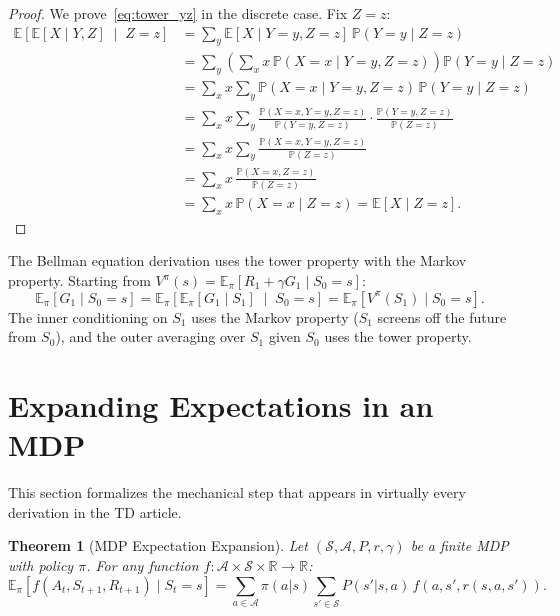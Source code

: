 \documentclass[11pt,a4paper]{article}
\theoremstyle{definition}
\theoremstyle{plain}
\newtheorem{theorem}{Theorem}[section]
\theoremstyle{remark}
\newcommand{\E}{\mathbb{E}}
\newcommand{\R}{\mathbb{R}}
\newcommand{\Prob}{\mathbb{P}}
\begin{document}
\begin{proof}
We prove~\eqref{eq:tower_yz} in the discrete case. Fix $Z = z$:
\begin{align}
    \E\!\left[\E[X \mid Y, Z] \;\middle|\; Z = z\right]
    &= \sum_y \E[X \mid Y = y, Z = z]\, \Prob(Y = y \mid Z = z) \nonumber\\
    &= \sum_y \left(\sum_x x\, \Prob(X = x \mid Y = y, Z = z)\right) \Prob(Y = y \mid Z = z) \nonumber\\
    &= \sum_x x \sum_y \Prob(X = x \mid Y = y, Z = z)\, \Prob(Y = y \mid Z = z) \nonumber\\
    &= \sum_x x \sum_y \frac{\Prob(X = x, Y = y, Z = z)}{\Prob(Y = y, Z = z)} \cdot \frac{\Prob(Y = y, Z = z)}{\Prob(Z = z)} \nonumber\\
    &= \sum_x x \sum_y \frac{\Prob(X = x, Y = y, Z = z)}{\Prob(Z = z)} \nonumber\\
    &= \sum_x x\, \frac{\Prob(X = x, Z = z)}{\Prob(Z = z)} \nonumber\\
    &= \sum_x x\, \Prob(X = x \mid Z = z) = \E[X \mid Z = z]. \label{eq:tower_general_proof}
\end{align}
\end{proof}

\begin{tdconnection}
The Bellman equation derivation uses the tower property with the Markov property. Starting from $V^\pi(s) = \E_\pi[R_1 + \gamma G_1 \mid S_0 = s]$:
\[
    \E_\pi[G_1 \mid S_0 = s] = \E_\pi\!\left[\E_\pi[G_1 \mid S_1] \;\middle|\; S_0 = s\right] = \E_\pi[V^\pi(S_1) \mid S_0 = s].
\]
The inner conditioning on $S_1$ uses the Markov property ($S_1$ screens off the future from $S_0$), and the outer averaging over $S_1$ given $S_0$ uses the tower property.
\end{tdconnection}

\section{Expanding Expectations in an MDP}
\label{sec:expanding}

This section formalizes the mechanical step that appears in virtually every derivation in the TD article.

\begin{theorem}[MDP Expectation Expansion]
\label{thm:mdp_expansion}
Let $(\mathcal{S}, \mathcal{A}, P, r, \gamma)$ be a finite MDP with policy $\pi$. For any function $f: \mathcal{A} \times \mathcal{S} \times \R \to \R$:
\begin{equation}
    \E_\pi[f(A_t, S_{t+1}, R_{t+1}) \mid S_t = s] = \sum_{a \in \mathcal{A}} \pi(a|s) \sum_{s' \in \mathcal{S}} P(s'|s,a)\, f(a, s', r(s,a,s')).
    \label{eq:mdp_expansion}
\end{equation}
\end{theorem}
\end{document}
